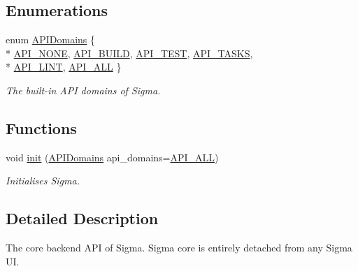 \subsection*{Enumerations}
\begin{DoxyCompactItemize}
\item 
enum \hyperlink{namespacesigma_1_1core_a48ec553a4adec5e4ca04a94946e39227}{A\+P\+I\+Domains} \{ \\*
\hyperlink{namespacesigma_1_1core_a48ec553a4adec5e4ca04a94946e39227ad5c128a2a2f3f1354dc44fd6e477b2c9}{A\+P\+I\+\_\+\+N\+O\+N\+E}, 
\hyperlink{namespacesigma_1_1core_a48ec553a4adec5e4ca04a94946e39227a21b294c75f929374e9eebfa67e31d80b}{A\+P\+I\+\_\+\+B\+U\+I\+L\+D}, 
\hyperlink{namespacesigma_1_1core_a48ec553a4adec5e4ca04a94946e39227acd512ee6c623f9c4b6faafc279cb93c8}{A\+P\+I\+\_\+\+T\+E\+S\+T}, 
\hyperlink{namespacesigma_1_1core_a48ec553a4adec5e4ca04a94946e39227a165d0d460d4f55091c38bab695b27bb4}{A\+P\+I\+\_\+\+T\+A\+S\+K\+S}, 
\\*
\hyperlink{namespacesigma_1_1core_a48ec553a4adec5e4ca04a94946e39227aac7402732b780aa9407183ed7bd7c809}{A\+P\+I\+\_\+\+L\+I\+N\+T}, 
\hyperlink{namespacesigma_1_1core_a48ec553a4adec5e4ca04a94946e39227a5328f8d7cbf6b6709e5f314832bcb007}{A\+P\+I\+\_\+\+A\+L\+L}
 \}\begin{DoxyCompactList}\small\item\em The built-\/in A\+P\+I domains of Sigma. \end{DoxyCompactList}
\end{DoxyCompactItemize}
\subsection*{Functions}
\begin{DoxyCompactItemize}
\item 
void \hyperlink{namespacesigma_1_1core_ae59ffd8d8b483f24878a0bf7425c436c}{init} (\hyperlink{namespacesigma_1_1core_a48ec553a4adec5e4ca04a94946e39227}{A\+P\+I\+Domains} api\+\_\+domains=\hyperlink{namespacesigma_1_1core_a48ec553a4adec5e4ca04a94946e39227a5328f8d7cbf6b6709e5f314832bcb007}{A\+P\+I\+\_\+\+A\+L\+L})
\begin{DoxyCompactList}\small\item\em Initialises Sigma. \end{DoxyCompactList}\end{DoxyCompactItemize}


\subsection{Detailed Description}
The core backend A\+P\+I of Sigma. Sigma core is entirely detached from any Sigma U\+I. 

